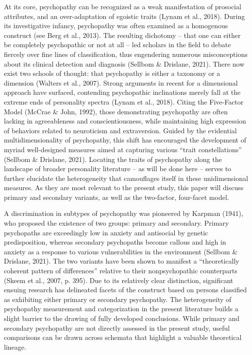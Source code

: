 \documentclass[
  man,floatsintext]{apa7}
\begin{document}
At its core, psychopathy can be recognized as a weak manifestation of prosocial attributes, and an over-adaptation of egoistic traits (Lynam et al., 2018). During its investigative infancy, psychopathy was often examined as a homogenous construct (see Berg et al., 2013). The resulting dichotomy -- that one can either be completely psychopathic or not at all -- led scholars in the field to debate fiercely over fine lines of classification, thus engendering numerous misconceptions about its clinical detection and diagnosis (Sellbom \& Drislane, 2021). There now exist two schools of thought: that psychopathy is either a taxonomy or a dimension (Walters et al., 2007). Strong arguments in recent for a dimensional approach have surfaced, contending psychopathic inclinations merely fall at the extreme ends of personality spectra (Lynam et al., 2018). Citing the Five-Factor Model (McCrae \& John, 1992), those demonstrating psychopathy are often lacking in agreeableness and conscientiousness, while maintaining high expression of behaviors related to neuroticism and extraversion. Guided by the evidential multidimensionality of psychopathy, this shift has encouraged the development of myriad well-designed measures aimed at capturing various ``trait constellations'' (Sellbom \& Drislane, 2021). Locating the traits of psychopathy along the landscape of broader personality literature -- as will be done here -- serves to further elucidate the heterogeneity that camouflages itself in these unidimensional measures. As they are most relevant to the present study, this paper will discuss primary and secondary variants, as well as the two-factor, four-facet model.

A discrimination in subtypes of psychopathy was pioneered by Karpman (1941), who proposed the existence of two groups: primary and secondary. Primary psychopaths are exceedingly low in anxiety and antisocial by genetic predisposition, whereas secondary psychopaths become callous and high in anxiety as a response to various vulnerabilities in the environment (Sellbom \& Drislane, 2021). The two variants have been shown to manifest a ``theoretically coherent pattern of differences'' relative to their nonpsychopathic counterparts (Skeem et al., 2007, p. 395). Due to its relatively clear distinction, significant ensuing research has delineated facets of the construct based on persons classified as exhibiting either primary or secondary psychopathy. The heterogeneity of psychopathy measurement and categorization in the present literature builds a slight barrier to the drawing of fully developed conclusions. While primary and secondary psychopathy are not directly assessed in the present study, useful comparisons can be drawn across schemata that highlight a valuable theoretical lineage.
\end{document}
